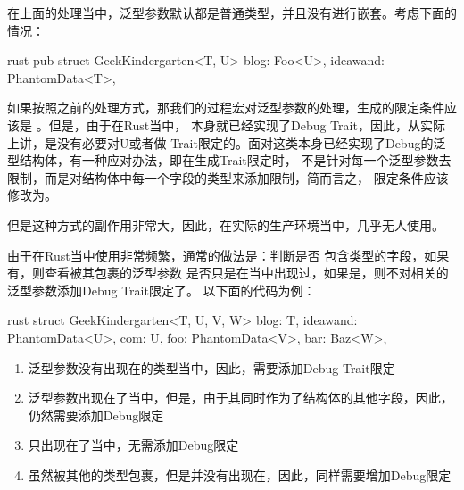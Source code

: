 在上面的处理当中，泛型参数默认都是普通类型，并且没有进行嵌套。考虑下面的情况：
\begin{code-block}{rust}
pub struct GeekKindergarten<T, U> {
    blog: Foo<U>,
    ideawand: PhantomData<T>,
}
\end{code-block}
如果按照之前的处理方式，那我们的过程宏对泛型参数的处理，生成的限定条件应该是
。但是，由于在Rust当中，
本身就已经实现了Debug Trait，因此，从实际上讲，是没有必要对U或者做
Trait限定的。面对这类本身已经实现了Debug的泛型结构体，有一种应对办法，即在生成Trait限定时，
不是针对每一个泛型参数去限制，而是对结构体中每一个字段的类型来添加限制，简而言之，
限定条件应该修改为。
\begin{critical}
但是这种方式的副作用非常大，因此，在实际的生产环境当中，几乎无人使用。
\end{critical}

由于在Rust当中使用非常频繁，通常的做法是：判断是否
包含类型的字段，如果有，则查看被其包裹的泛型参数
是否只是在当中出现过，如果是，则不对相关的泛型参数添加Debug Trait限定了。
以下面的代码为例：
\begin{code-block}{rust}
struct GeekKindergarten<T, U, V, W> {
    blog: T,
    ideawand: PhantomData<U>,
    com: U,
    foo: PhantomData<V>,
    bar: Baz<W>,
}
\end{code-block}

\begin{note}
\begin{enumerate}
  \item 泛型参数没有出现在的类型当中，因此，需要添加Debug Trait限定
  \item 泛型参数出现在了当中，但是，由于其同时作为了结构体的其他字段，因此，仍然需要添加Debug限定
  \item {}只出现在了当中，无需添加Debug限定
  \item {}虽然被其他的类型包裹，但是并没有出现在，因此，同样需要增加Debug限定
\end{enumerate}
\end{note}

